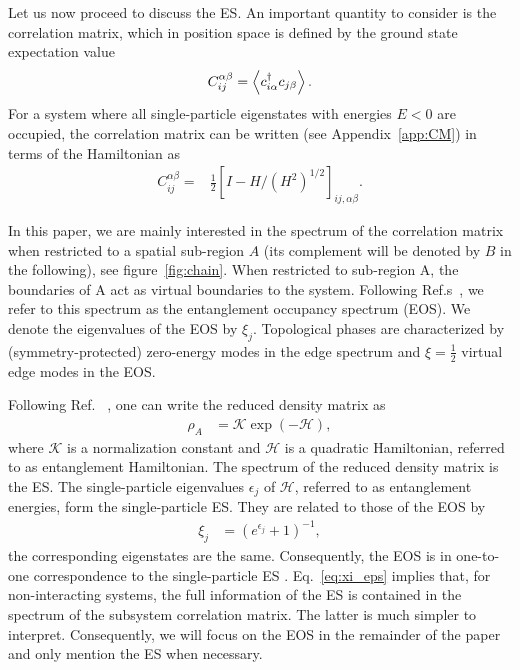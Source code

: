 \documentclass[twocolumn,amsmath,longbibliography,amssymb,superscriptaddress]{revtex4-1}
\begin{document}
Let us now proceed to discuss the ES. 
An important quantity to consider is the correlation matrix, which in position space is defined by the ground state expectation value
\begin{align}
C_{ij}^{\alpha \beta} = \expval{c_{i\alpha}^\dagger c_{j\beta}}.
\end{align}
For a system where all single-particle eigenstates with energies $E<0$ are occupied, the correlation matrix can be written (see  Appendix~\ref{app:CM}) in terms of the Hamiltonian as
\begin{align}\label{eq:corr_mat2}
C_{ij}^{\alpha \beta} =& \frac{1}{2}\left[I - H/ (H^2)^{1/2} \right]_{ij, \alpha \beta}.
\end{align}

In this paper, we are mainly interested in the spectrum of the correlation matrix when restricted to a spatial sub-region $A$ (its complement will be denoted by $B$ in the following), see figure~\ref{fig:chain}. When restricted to sub-region A, the boundaries of A act as virtual boundaries to the system.
Following Ref.s~\cite{Huang2012,Huang2012-2}, we refer to this spectrum as the entanglement occupancy spectrum (EOS).
We denote the eigenvalues of the EOS by $\xi_j$. 
Topological phases are characterized by (symmetry-protected) zero-energy modes in the edge spectrum and $\xi=\frac 1 2$ virtual edge modes in the EOS. 


Following Ref.~\cite{Peschel2003,Peschel2008} , one can write the  reduced density matrix as 
\begin{align}\label{eq:red_dens_mat}
\rho_A&=\mathcal{K} \exp(-\mathcal H),
\end{align}
where $\mathcal{K}$ is a normalization constant and $\mathcal{H}$ is a quadratic Hamiltonian, referred to as entanglement Hamiltonian. 
The spectrum of the reduced density matrix is the ES. The single-particle eigenvalues $\epsilon_j$ of $\mathcal{H}$, referred to as entanglement energies, form the single-particle ES. They are related to those of the EOS by 
\begin{align}\label{eq:xi_eps}
\xi_j &=\left(e^{\epsilon_j}+1\right)^{-1}, 
\end{align}
the corresponding eigenstates are the same. Consequently, the EOS is in one-to-one correspondence to the single-particle ES \cite{Fidkowski2010entanglement}.
Eq.~\eqref{eq:xi_eps} implies that, for non-interacting systems, the full information of the ES is contained in the spectrum of the subsystem correlation matrix. 
The latter is much simpler to interpret. 
Consequently, we will focus on the EOS in the remainder of the paper and only mention the ES when necessary. 
\end{document}
